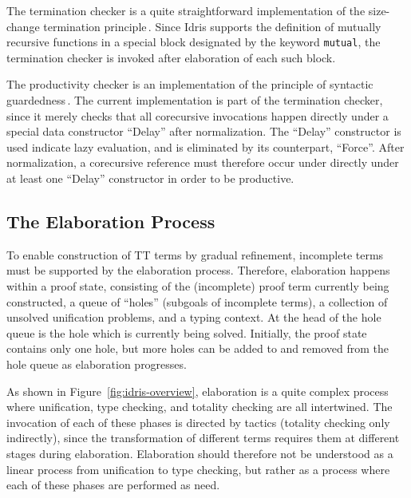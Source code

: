 The termination checker is a quite straightforward implementation of the
size-change termination principle\,\citep{LeeJones01SizeChange}. Since Idris
supports the definition of mutually recursive functions in a special block
designated by the keyword \texttt{mutual}, the termination checker
is invoked after elaboration of each such block.

The productivity checker is an implementation of the principle of
syntactic guardedness\,\citep{Coquand94}. The current implementation is
part of the termination checker, since it merely checks that all
corecursive invocations happen directly under a special data constructor
``Delay'' after normalization. The ``Delay'' constructor is used indicate lazy
evaluation, and is eliminated by its counterpart, ``Force''. After normalization,
a corecursive reference must therefore occur under directly under at least one
``Delay'' constructor in order to be productive.

\subsection{The Elaboration Process}
To enable construction of TT terms by gradual refinement, incomplete terms must
be supported by the elaboration process. Therefore, elaboration happens within a
proof state, consisting of the (incomplete) proof term currently being
constructed, a queue of ``holes'' (subgoals of incomplete terms), a collection
of unsolved unification problems, and a typing context. At the head of the hole
queue is the hole which is currently being solved. Initially, the proof state
contains only one hole, but more holes can be added to and removed from the hole
queue as elaboration progresses.

As shown in Figure~\ref{fig:idris-overview}, elaboration is a quite complex
process where unification, type checking, and totality checking are all
intertwined. The invocation of each of these phases is directed by tactics
(totality checking only indirectly), since the transformation of different terms
requires them at different stages during elaboration. Elaboration should
therefore not be understood as a linear process from unification to type
checking, but rather as a process where each of these phases are performed as
need.

